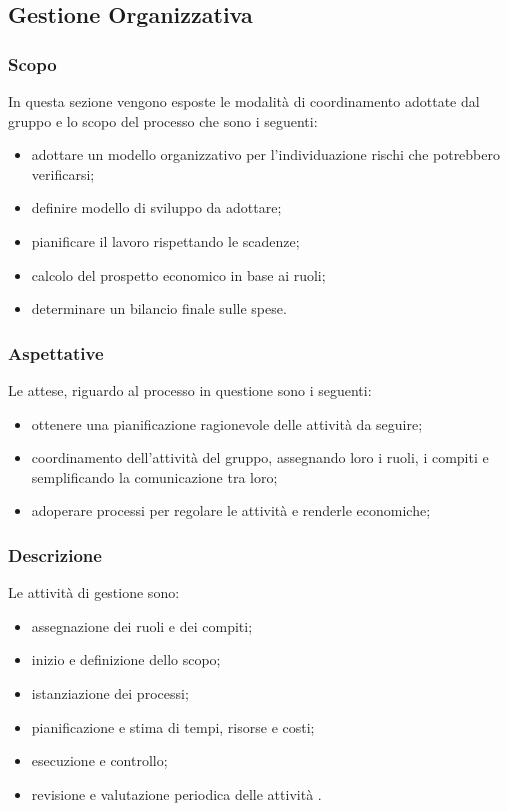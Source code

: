 \subsection{Gestione Organizzativa}
\subsubsection{Scopo}
In questa sezione vengono esposte le modalità  di coordinamento adottate dal gruppo e lo scopo del processo che sono i seguenti:
\begin{itemize}
\item adottare un modello organizzativo per l'individuazione rischi che potrebbero verificarsi;
\item definire modello di sviluppo da adottare;
\item pianificare il lavoro rispettando le scadenze;
\item calcolo del prospetto economico in base ai ruoli;
\item determinare un bilancio finale sulle spese.

\end{itemize}
\subsubsection{Aspettative}
Le attese, riguardo al processo in questione sono i seguenti: 
\begin{itemize}
\item ottenere una pianificazione ragionevole delle attività da seguire;
\item coordinamento dell'attività  del gruppo, assegnando loro i ruoli, i compiti e semplificando la comunicazione tra loro;
\item adoperare processi per regolare le attività  e renderle economiche;

\end{itemize}

\subsubsection{Descrizione}
Le attività  di gestione sono: 
\begin{itemize}
\item assegnazione dei ruoli e dei compiti;
\item inizio e definizione dello scopo;
\item istanziazione dei processi;
\item pianificazione e stima di tempi, risorse e costi;
\item esecuzione e controllo;
\item revisione e valutazione periodica delle attività .
\end{itemize}

